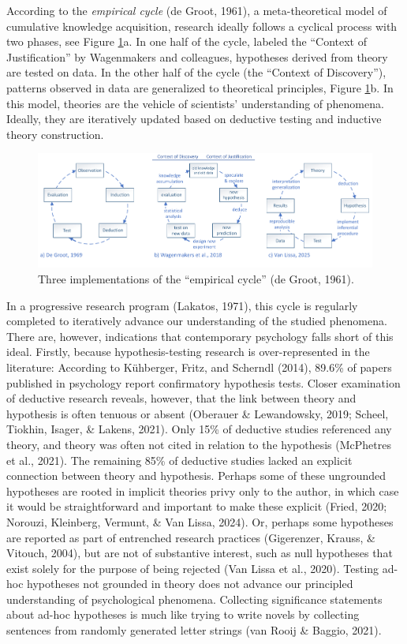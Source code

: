 \documentclass[
  man, noextraspace,floatsintext]{apa6}
\begin{document}
According to the \emph{empirical cycle} (de Groot, 1961),
a meta-theoretical model of cumulative knowledge acquisition,
research ideally follows a cyclical process with two phases, see Figure \ref{fig:figecs}a.
In one half of the cycle, labeled the ``Context of Justification'' by Wagenmakers and colleagues, hypotheses derived from theory are tested on data. In the other half of the cycle (the ``Context of Discovery''),
patterns observed in data are generalized to theoretical principles, Figure \ref{fig:figecs}b.
In this model, theories are the vehicle of scientists' understanding of phenomena.
Ideally, they are iteratively updated based on deductive testing and inductive theory construction.

\begin{figure}
\centering
\includegraphics{ec_visio.pdf}
\caption{\label{fig:figecs}Three implementations of the ``empirical cycle'' (de Groot, 1961).}
\end{figure}

In a progressive research program (Lakatos, 1971),
this cycle is regularly completed to iteratively advance our understanding of the studied phenomena.
There are, however, indications that contemporary psychology falls short of this ideal.
Firstly, because hypothesis-testing research is over-represented in the literature:
According to Kühberger, Fritz, and Scherndl (2014), 89.6\% of papers published in psychology report confirmatory hypothesis tests.
Closer examination of deductive research reveals, however, that the link between theory and hypothesis is often tenuous or absent (Oberauer \& Lewandowsky, 2019; Scheel, Tiokhin, Isager, \& Lakens, 2021).
Only 15\% of deductive studies referenced any theory, and theory was often not cited in relation to the hypothesis (McPhetres et al., 2021).
The remaining 85\% of deductive studies lacked an explicit connection between theory and hypothesis.
Perhaps some of these ungrounded hypotheses are rooted in implicit theories privy only to the author,
in which case it would be straightforward and important to make these explicit (Fried, 2020; Norouzi, Kleinberg, Vermunt, \& Van Lissa, 2024).
Or, perhaps some hypotheses are reported as part of entrenched research practices (Gigerenzer, Krauss, \& Vitouch, 2004),
but are not of substantive interest, such as null hypotheses that exist solely for the purpose of being rejected (Van Lissa et al., 2020).
Testing ad-hoc hypotheses not grounded in theory does not advance our principled understanding of psychological phenomena.
Collecting significance statements about ad-hoc hypotheses is much like trying to write novels by collecting sentences from randomly generated letter strings (van Rooij \& Baggio, 2021).
\end{document}
